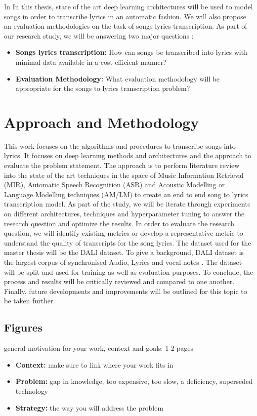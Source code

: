 In In this thesis, state of the art deep learning architectures will be used to model songs in order to transcribe lyrics in an automatic fashion. We will also propose an evaluation methodologies on the task of songs lyrics transcription. As part of our research study, we will be answering two major questions : 

\begin{itemize}
    \item \textbf{Songs lyrics transcription:} How can songs be transcribed into lyrics with minimal data available in a cost-efficient manner?
    \item \textbf{Evaluation Methodology:} What evaluation methodology will be appropriate for the songs to lyrics transcription problem?
\end{itemize}



\section{Approach and Methodology}

This work focuses on the algorithms and procedures to transcribe songs into lyrics. It focuses on deep learning methods and architectures and the approach to evaluate the problem statement. The approach is to perform literature review into the state of the art techniques in the space of Music Information Retrieval (MIR), Automatic Speech Recognition (ASR) and Acoustic Modelling or Language Modelling techniques (AM/LM) to create an end to end song to lyrics transcription model. As part of the study, we will be iterate through experiments on different architectures, techniques and hyperparameter tuning to answer the research question and optimize the results. In order to evaluate the research question, we will identify existing metrics or develop a representative metric to understand the quality of transcripts for the song lyrics. The dataset used for the master thesis will be the DALI dataset. To give a background, DALI dataset is the largest corpus of  synchronised Audio, Lyrics and vocal notes \cite{meseguer2020creating}. The dataset will be split and used for training as well as evaluation purposes. To conclude, the process and results will be critically reviewed and compared to one another. Finally, future developments and improvements will be outlined for this topic to be taken further. 

\subsection{Figures}%
\label{sec:figures}

general motivation for your work, context and goals: 1-2 pages

\begin{itemize}
    \item \textbf{Context:} make sure to link where your work fits in
    \item \textbf{Problem:} gap in knowledge, too expensive, too slow, a deficiency, superseded technology
    \item \textbf{Strategy:} the way you will address the problem
\end{itemize}


